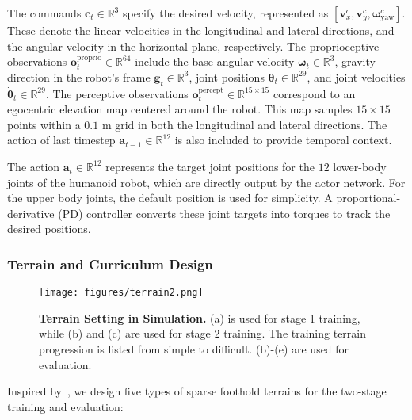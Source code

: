 The commands $\mathbf{c}_t \in \mathbb{R}^3$ specify the desired velocity, represented as $\left[ \mathbf{v}_x^c, \mathbf{v}_y^c, \boldsymbol{\omega}_\text{yaw}^c \right]$. These denote the linear velocities in the longitudinal and lateral directions, and the angular velocity in the horizontal plane, respectively. The proprioceptive observations $\mathbf{o}_t^\text{proprio} \in \mathbb{R}^{64}$ include the base angular velocity $\bm{\omega}_t \in \mathbb{R}^3$, gravity direction in the robot's frame $\mathbf{g}_t \in \mathbb{R}^3$, joint positions $\bm{\theta}_t \in \mathbb{R}^{29}$, and joint velocities $\dot{\bm{\theta}}_t \in \mathbb{R}^{29}$. The perceptive observations $\mathbf{o}_t^\text{percept} \in \mathbb{R}^{15 \times 15}$ correspond to an egocentric elevation map centered around the robot. This map samples $15 \times 15$ points within a $0.1$ m grid in both the longitudinal and lateral directions. The action of last timestep $\mathbf{a}_{t-1} \in \mathbb{R}^{12}$ is also included to provide temporal context.

The action $\mathbf{a}_t \in \mathbb{R}^{12}$ represents the target joint positions for the $12$ lower-body joints of the humanoid robot, which are directly output by the actor network. For the upper body joints, the default position is used for simplicity. A proportional-derivative (PD) controller converts these joint targets into torques to track the desired positions.

\subsubsection{Terrain and Curriculum Design}
\label{sec:method_curriculum}

\begin{figure}[t]
    \centering
    \texttt{[image: figures/terrain2.png]}
    \caption{\textbf{Terrain Setting in Simulation.} (a) is used for stage 1 training, while (b) and (c) are used for stage 2 training. The training terrain progression is listed from simple to difficult. (b)-(e) are used for evaluation.}
    \label{fig:terrain}
\end{figure}

Inspired by~\cite{heess2017emergence, yu2024walking, Zhang2023LearningAL}, we design five types of sparse foothold terrains for the two-stage training and evaluation:

